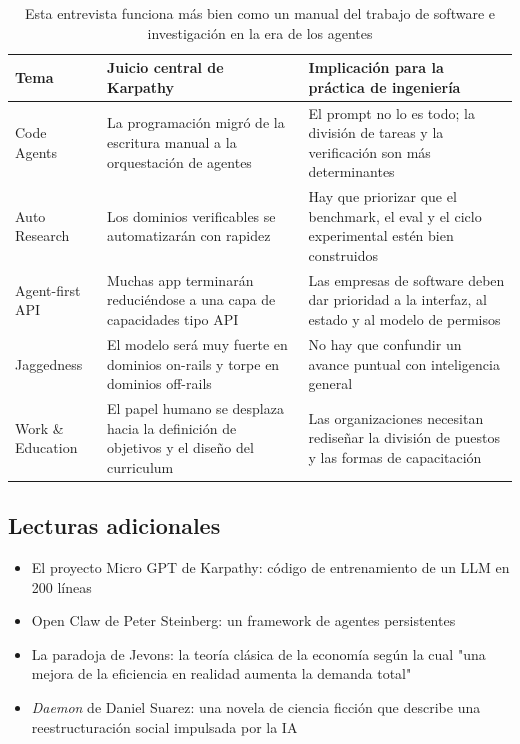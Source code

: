 \documentclass[a4paper]{article}
\begin{document}
\begin{table}[H]
\centering
\begin{tabular}{p{3.0cm}p{4.5cm}p{4.4cm}}
\toprule
\textbf{Tema} & \textbf{Juicio central de Karpathy} & \textbf{Implicación para la práctica de ingeniería} \\
\midrule
Code Agents & La programación migró de la escritura manual a la orquestación de agentes & El prompt no lo es todo; la división de tareas y la verificación son más determinantes \\
Auto Research & Los dominios verificables se automatizarán con rapidez & Hay que priorizar que el benchmark, el eval y el ciclo experimental estén bien construidos \\
Agent-first API & Muchas app terminarán reduciéndose a una capa de capacidades tipo API & Las empresas de software deben dar prioridad a la interfaz, al estado y al modelo de permisos \\
Jaggedness & El modelo será muy fuerte en dominios on-rails y torpe en dominios off-rails & No hay que confundir un avance puntual con inteligencia general \\
Work \& Education & El papel humano se desplaza hacia la definición de objetivos y el diseño del curriculum & Las organizaciones necesitan rediseñar la división de puestos y las formas de capacitación \\
\bottomrule
\end{tabular}
\caption{Esta entrevista funciona más bien como un manual del trabajo de software e investigación en la era de los agentes}
\end{table}

\subsection{Lecturas adicionales}

\begin{itemize}
    \item El proyecto Micro GPT de Karpathy: código de entrenamiento de un LLM en 200 líneas
    \item Open Claw de Peter Steinberg: un framework de agentes persistentes
    \item La paradoja de Jevons: la teoría clásica de la economía según la cual "una mejora de la eficiencia en realidad aumenta la demanda total"
    \item \textit{Daemon} de Daniel Suarez: una novela de ciencia ficción que describe una reestructuración social impulsada por la IA
\end{itemize}

\end{document}
